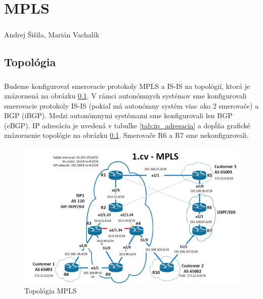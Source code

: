 \documentclass[12pt,twoside,a4paper]{report}
\begin{document}

\setcounter{chapter}{1}
\chapter*{MPLS}
\paragraph{}
Andrej Šišila, Marián Vachalík

\tableofcontents

\newpage
\section{Topológia}
\paragraph{}
Budeme konfigurovať smerovacie protokoly MPLS a IS-IS na topológií, ktorá je znázornená na obrázku \ref{fig:mpls_isis_topo}. V rámci autonómnych systémov sme konfigurovali smerovacie protokoly IS-IS (pokiaľ má autonómny systém viac ako 2 smerovače) a BGP (iBGP). Medzi autonómnymi systémami sme konfigurovali len BGP (eBGP). IP adresácia je uvedená v tabuľke \ref{tab:ip_adresacia} a dopĺňa grafické znázornenie topológie na obrázku \ref{fig:mpls_isis_topo}. Smerovače R6 a R7 sme nekonfigurovali.

\begin{figure}[!htbp]
\centering
\includegraphics[width=14cm,keepaspectratio]{mpls_isis_topo}
\caption{Topológia MPLS}
\label{fig:mpls_isis_topo}
\end{figure}
\end{document}
